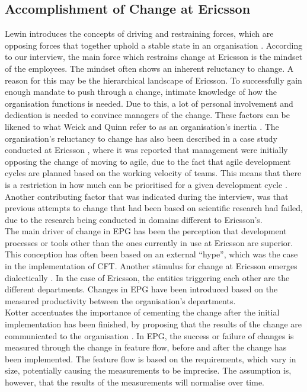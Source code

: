 \documentclass[final_report_innit.tex]{subfiles}
\begin{document}
\subsection{Accomplishment of Change at Ericsson}
Lewin introduces the concepts of driving and restraining forces, which are opposing forces that together uphold a stable state in an organisation \cite{burnes2004kurt}. According to our interview, the main force which restrains change at Ericsson is the mindset of the employees. The mindset often shows an inherent reluctancy to change. A reason for this may be the hierarchical landscape of Ericsson. To successfully gain enough mandate to push through a change, intimate knowledge of how the organisation functions is needed. Due to this, a lot of personal involvement and dedication is needed to convince managers of the change. These factors can be likened to what Weick and Quinn refer to as an organisation's inertia \cite{weick1999organizational}. The organisation's reluctancy to change has also been described in a case study conducted at Ericsson \cite{karlstrom2005combining}, where it was reported that management were initially opposing the change of moving to agile, due to the fact that agile development cycles are planned based on the working velocity of teams. This means that there is a restriction in how much can be prioritised for a given development cycle \cite{karlstrom2005combining}. Another contributing factor that was indicated during the interview, was that previous attempts to change that had been based on scientific research had failed, due to the research being conducted in domains different to Ericsson's. 
\\

The main driver of change in EPG has been the perception that development processes or tools other than the ones currently in use at Ericsson are superior. This conception has often been based on an external ``hype'', which was the case in the implementation of CFT. Another stimulus for change at Ericsson emerges dialectically \cite{van1995explaining}. In the case of Ericsson, the entities triggering each other are the different departments. Changes in EPG have been introduced based on the measured productivity between the organisation's departments.
\\

Kotter accentuates the importance of cementing the change after the initial implementation has been finished, by proposing that the results of the change are communicated to the organisation \cite{kotter1995leading}. In EPG, the success or failure of changes is measured through the change in feature flow, before and after the change has been implemented. The feature flow is based on the requirements, which vary in size, potentially causing the measurements to be imprecise. The assumption is, however, that the results of the measurements will normalise over time.   
\end{document}
